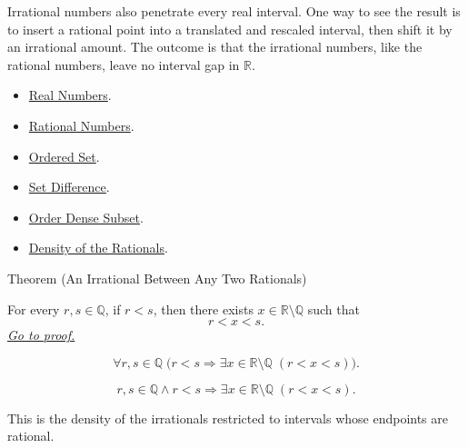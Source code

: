\begin{remark*}[Interpretation]
Irrational numbers also penetrate every real interval. One way to see the result is to insert a rational point into a translated and rescaled interval, then shift it by an irrational amount. The outcome is that the irrational numbers, like the rational numbers, leave no interval gap in $\mathbb{R}$.
\end{remark*}

\begin{dependencies}
\begin{itemize}
\item \hyperref[def:reals]{Real Numbers}.
\item \hyperref[def:rationals]{Rational Numbers}.
\item \hyperref[def:ordered-set]{Ordered Set}.
\item \hyperref[def:set-difference]{Set Difference}.
\item \hyperref[def:order-dense-subset]{Order Dense Subset}.
\item \hyperref[thm:density-of-rationals-in-reals]{Density of the Rationals}.
\end{itemize}
\end{dependencies}





\begin{theorembox}{Theorem (An Irrational Between Any Two Rationals)}
\begin{theorem}
\label{thm:irrational-between-any-two-rationals}
For every $r,s\in\mathbb{Q}$, if $r<s$, then there exists
$x\in\mathbb{R}\setminus\mathbb{Q}$ such that
\[
  r<x<s.
\]
\hyperref[prf:irrational-between-any-two-rationals]{\textit{Go to proof.}}
\end{theorem}
\end{theorembox}

\begin{remark*}
\[
\forall r,s\in\mathbb{Q}\;
\bigl(r<s\Longrightarrow
\exists x\in\mathbb{R}\setminus\mathbb{Q}\;(r<x<s)\bigr).
\]
\end{remark*}

\begin{remark*}
\[
r,s\in\mathbb{Q}\land r<s
\Longrightarrow \exists x\in\mathbb{R}\setminus\mathbb{Q}\;(r<x<s).
\]
\end{remark*}

\begin{remark*}[Interpretation]
This is the density of the irrationals restricted to intervals whose endpoints
are rational.
\end{remark*}

